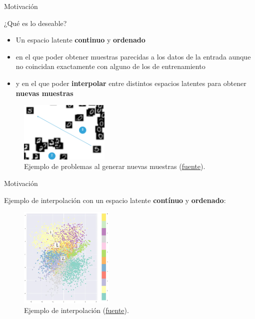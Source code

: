 \begin{frame}{Motivación}

¿Qué es lo deseable?

\begin{itemize}
    \item Un espacio latente \textbf{continuo} y \textbf{ordenado}
    \item en el que poder obtener muestras parecidas a los datos de la entrada aunque no coincidan exactamente con alguno de los de entrenamiento
    \item y en el que poder \textbf{interpolar} entre distintos espacios latentes para obtener \textbf{nuevas muestras}
\end{itemize}

\begin{figure}
    \centering
    \includegraphics[width=0.38\textwidth]{Slides/figures/02_Metodos_Generativos/ae-desired-latent-space.png}
    \caption{Ejemplo de problemas al generar nuevas muestras (\href{https://indico.ictp.it/event/8674/session/155/contribution/1121/material/slides/0.pdf}{fuente}).}
    \label{fig:enter-label}
\end{figure}

\end{frame}


\begin{frame}{Motivación}

Ejemplo de interpolación con un espacio latente \textbf{contínuo} y \textbf{ordenado}:

\begin{figure}
    \centering
    \includegraphics[width=0.4\textwidth]{Slides/figures/02_Metodos_Generativos/vae-interpolation.png}
    \caption{Ejemplo de interpolación (\href{https://towardsdatascience.com/intuitively-understanding-variational-autoencoders-1bfe67eb5daf}{fuente}).}
    \label{fig:enter-label}
\end{figure}

\end{frame}


